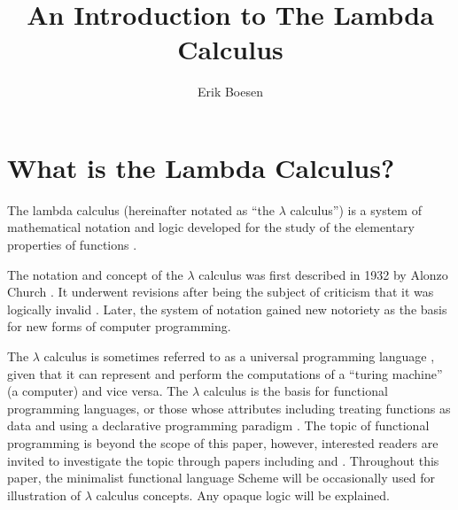 \documentclass{article}
\begin{document}
\title{An Introduction to The Lambda Calculus}
\author{Erik Boesen}
\maketitle

\begin{abstract}
\end{abstract}

\section{What is the Lambda Calculus?}
The lambda calculus (hereinafter notated as ``the $\lambda$ calculus'') is a system of mathematical notation and logic developed for the study of the elementary properties of functions \cite{rojastutorial}.

The notation and concept of the $\lambda$ calculus was first described in 1932 by Alonzo Church \cite{church}. It underwent revisions after being the subject of criticism that it was logically invalid \cite{church2}. Later, the system of notation gained new notoriety as the basis for new forms of computer programming.

The $\lambda$ calculus is sometimes referred to as a universal programming language \cite{rojastutorial}, given that it can represent and perform the computations of a ``turing machine'' (a computer) and vice versa. The $\lambda$ calculus is the basis for functional programming languages, or those whose attributes including treating functions as data and using a declarative programming paradigm \cite{hudakevolution}. The topic of functional programming is beyond the scope of this paper, however, interested readers are invited to investigate the topic through papers including \cite{totalfp} and \cite{hudakevolution}. Throughout this paper, the minimalist functional language Scheme will be occasionally used for illustration of $\lambda$ calculus concepts. Any opaque logic will be explained.


\end{document}
